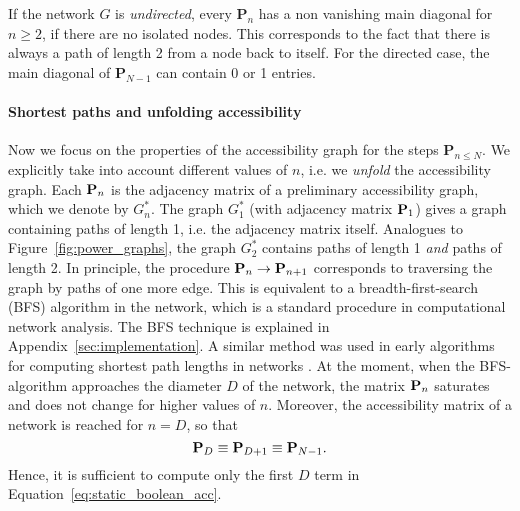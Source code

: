 If the network $G$ is \emph{undirected}, every $\mathbf{P}_n$ has a non vanishing main diagonal for $n\geq 2$, if there are no isolated nodes.
This corresponds to the fact that there is always a path of length 2 from a node back to itself.
For the directed case, the main diagonal of $\mathbf{P}_{N-1}$ can contain 0 or 1 entries.

\paragraph{Shortest paths and unfolding accessibility\color{Cayenne}{.}}
Now we focus on the properties of the accessibility graph for the steps $\mathbf{P}_{n\leq N}$.
We explicitly take into account different values of $n$, i.e. we \emph{unfold} the accessibility graph.
Each $\mathbf{P}_n$ is the adjacency matrix of a preliminary accessibility graph, which we denote by $G_n ^*$.
The graph $G_1 ^*$ (with adjacency matrix $\mathbf{P}_1$) gives a graph containing paths of length 1, i.e. the adjacency matrix itself.
Analogues to Figure~\ref{fig:power_graphs}, the graph $G_2 ^*$ contains paths of length 1 \emph{and} paths of length 2.
In principle, the procedure $\mathbf{P}_n \rightarrow \mathbf{P}_{n+1}$ corresponds to traversing the graph by paths of one more edge.
This is equivalent to a breadth-first-search (BFS) algorithm in the network, which is a standard procedure in computational network analysis.
The BFS technique is explained in Appendix~\ref{sec:implementation}.
A similar method was used in early algorithms for computing shortest path lengths in networks \citep{Floyd:1962vo,Warshall:1962wr}.
At the moment, when the BFS-algorithm approaches the diameter $D$ of the network, the matrix $\mathbf{P}_n$ saturates and does not change for higher values of $n$.
Moreover, the accessibility matrix of a network is reached for $n=D$, so that
\begin{equation}\label{eq:diameter_sat}
\mathbf{P}_{D}\equiv \mathbf{P}_{D+1}\equiv \mathbf{P}_{N-1}.
\end{equation}
Hence, it is sufficient to compute only the first $D$ term in Equation~\eqref{eq:static_boolean_acc}.

